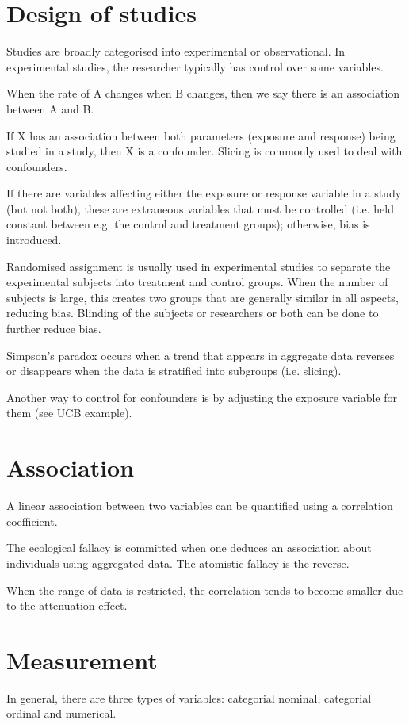 \documentclass{slnotes}
\begin{document}
\chapter{Design of studies}
Studies are broadly categorised into experimental or observational. In experimental studies, the researcher typically has control over some variables.

When the rate of A changes when B changes, then we say there is an association between A and B.

If X has an association between both parameters (exposure and response) being studied in a study, then X is a confounder. Slicing is commonly used to deal with confounders.

If there are variables affecting either the exposure or response variable in a study (but not both), these are extraneous variables that must be controlled (i.e. held constant between e.g. the control and treatment groups); otherwise, bias is introduced.

Randomised assignment is usually used in experimental studies to separate the experimental subjects into treatment and control groups. When the number of subjects is large, this creates two groups that are generally similar in all aspects, reducing bias. Blinding of the subjects or researchers or both can be done to further reduce bias.

Simpson's paradox occurs when a trend that appears in aggregate data reverses or disappears when the data is stratified into subgroups (i.e. slicing).

Another way to control for confounders is by adjusting the exposure variable for them (see UCB example).
\chapter{Association}
A linear association between two variables can be quantified using a correlation coefficient.

The ecological fallacy is committed when one deduces an association about individuals using aggregated data. The atomistic fallacy is the reverse.

When the range of data is restricted, the correlation tends to become smaller due to the attenuation effect.
\chapter{Measurement}
In general, there are three types of variables: categorial nominal, categorial ordinal and numerical.
\end{document}
